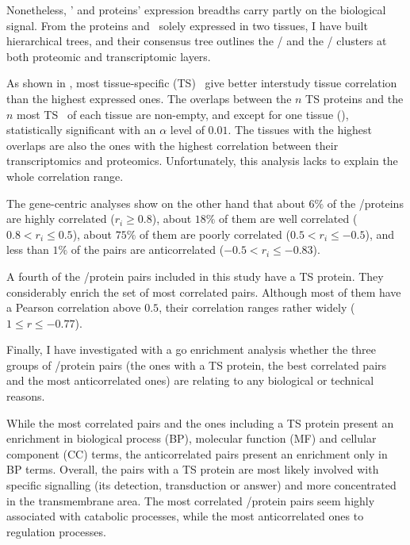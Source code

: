Nonetheless, \mRNAs{}' and proteins' expression breadths carry partly on
the biological signal.
From the proteins and \mRNAs\ solely expressed in two tissues,
I have built hierarchical trees,
and their consensus tree outlines
the \ovary{}/\testis{} and the \kidney{}/\liver{} clusters
at both proteomic and transcriptomic layers.\mybr\

As shown in ,
most tissue-specific (\gls{TS}) \mRNAs\ give better
interstudy tissue correlation
than the highest expressed ones.
The overlaps between the $n$ \gls{TS} proteins and
the $n$ most \gls{TS} \mRNAs\ of each tissue are non-empty,
and except for one tissue (),
statistically significant with an $\alpha$ level of $0.01$.
The tissues with the highest overlaps are
also the ones with the highest correlation
between their transcriptomics and proteomics.
Unfortunately, this analysis lacks to explain
the whole correlation range.\mybr\

The gene-centric analyses show on the other hand that
about $6\%$ of the \mRNAs/proteins are highly correlated ($r_i≥0.8$),
about $18\%$ of them are well correlated ($0.8 < r_i ≤ 0.5$),
about $75\%$ of them are poorly correlated ($0.5 < r_i ≤ -0.5$), and
less than $1\%$ of the pairs are anticorrelated ($-0.5 < r_i ≤ -0.83$).

A fourth of the \mRNA/protein pairs included in this study have a \gls{TS} protein.
They considerably enrich the set of most correlated pairs.
Although most of them have a Pearson correlation above $0.5$,
their correlation ranges rather widely ($1 ≤ r≤ -0.77$).

Finally, I have investigated with a \gls{go} enrichment analysis
whether the three groups of \mRNA/protein pairs
(the ones with a \gls{TS} protein, the best correlated pairs
and the most anticorrelated ones) are relating to
any biological or technical reasons.

While the most correlated pairs and the ones including a \gls{TS} protein
present an enrichment in biological process (BP),
molecular function (MF) and cellular component (CC) terms,
the anticorrelated pairs present an enrichment only in BP terms.
Overall, the pairs with a \gls{TS} protein are most likely involved
with specific signalling (its detection, transduction or answer)
and more concentrated in the transmembrane area.
The most correlated \mRNA/protein pairs seem highly associated
with catabolic processes,
while the most anticorrelated ones to regulation processes.

